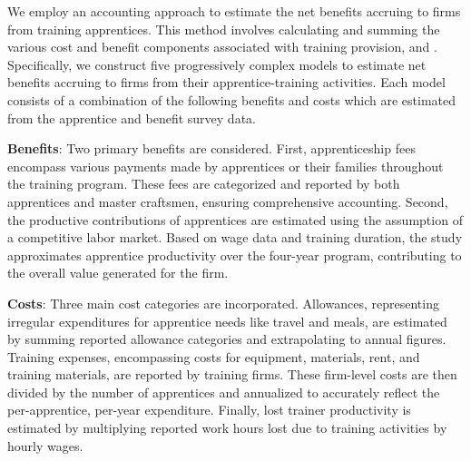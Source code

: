 \documentclass[
  a4paper, twoside, 12pt]{book}
\renewcommand{\hl}[1]{#1}
\newcommand{\hlc}[2][color]{}
\begin{document}
\begin{singlespacing}

\end{singlespacing}

 \hl{We employ an accounting approach }\autocite{gambin2013,muhlemann2014}\hl{ to estimate the net benefits accruing to firms from training apprentices. This method involves calculating and summing the various cost and benefit components associated with training provision, and} \hlc[lightgray]{has only recently started being applied in lower-middle income countries }\autocite{renold2018,bolli2020,bolli2021}. \hl{Specifically, we construct five progressively complex models to estimate net benefits accruing to firms from their apprentice-training activities. Each model consists of a combination of the following benefits and costs which are estimated from the apprentice and benefit survey data.}

\hl{\textbf{Benefits}: Two primary benefits are considered. First, apprenticeship fees encompass various payments made by apprentices or their families throughout the training program. These fees are categorized and reported by both apprentices and master craftsmen, ensuring comprehensive accounting. Second, the productive contributions of apprentices are estimated using the assumption of a competitive labor market. Based on wage data and training duration, the study approximates apprentice productivity over the four-year program, contributing to the overall value generated for the firm.}

\hl{\textbf{Costs}: Three main cost categories are incorporated. Allowances, representing irregular expenditures for apprentice needs like travel and meals, are estimated by summing reported allowance categories and extrapolating to annual figures. Training expenses, encompassing costs for equipment, materials, rent, and training materials, are reported by training firms. These firm-level costs are then divided by the number of apprentices and annualized to accurately reflect the per-apprentice, per-year expenditure. Finally, lost trainer productivity is estimated by multiplying reported work hours lost due to training activities by hourly wages.}
\end{document}
